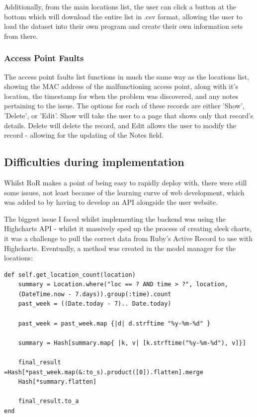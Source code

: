 \documentclass[11pt]{informatics-report}
\begin{document}
Additionally, from the main locations list, the user can click a button at the bottom which will download the entire list in .csv format, allowing the user to load the dataset into their own program and create their own information sets from there.

\subsubsection{Access Point Faults}

The access point faults list functions in much the same way as the locations list, showing the MAC address of the malfunctioning access point, along with it's location, the timestamp for when the problem was discovered, and any notes pertaining to the issue. The options for each of these records are either 'Show', 'Delete', or 'Edit'. Show will take the user to a page that shows only that record's details. Delete will delete the record, and Edit allows the user to modify the record - allowing for the updating of the Notes field. 

\subsection{Difficulties during implementation}

Whilst RoR makes a point of being easy to rapidly deploy with, there were still some issues, not least because of the learning curve of web development, which was added to by having to develop an API alongside the user website.

The biggest issue I faced whilst implementing the backend was using the Highcharts API - whilst it massively sped up the process of creating sleek charts, it was a challenge to pull the correct data from Ruby's Active Record to use with Highcharts. Eventually, a method was created in the model manager for the locations: 

\begin{verbatim}
def self.get_location_count(location)
	summary = Location.where("loc == ? AND time > ?", location, 
	(DateTime.now - 7.days)).group(:time).count
	past_week = ((Date.today - 7).. Date.today)

	past_week = past_week.map {|d| d.strftime "%y-%m-%d" }

	summary = Hash[summary.map{ |k, v| [k.strftime("%y-%m-%d"), v]}]

	final_result =Hash[*past_week.map(&:to_s).product([0]).flatten].merge 
	Hash[*summary.flatten]

	final_result.to_a
end
\end{verbatim}
\end{document}
